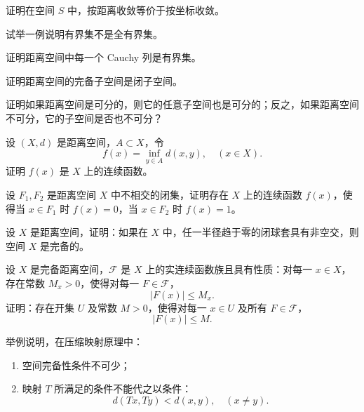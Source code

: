 \begin{exercise}
证明在空间 $S$ 中，按距离收敛等价于按坐标收敛。
\end{exercise}

\begin{exercise}
试举一例说明有界集不是全有界集。
\end{exercise}

\begin{exercise}
证明距离空间中每一个 Cauchy 列是有界集。
\end{exercise}

\begin{exercise}
证明距离空间的完备子空间是闭子空间。
\end{exercise}

\begin{exercise}
证明如果距离空间是可分的，则它的任意子空间也是可分的；反之，如果距离空间不可分，它的子空间是否也不可分？
\end{exercise}
\begin{exercise}
设 $(X,d)$ 是距离空间，$A \subset X$，令
\[
f(x) = \inf_{y \in A} d(x,y), \quad (x \in X).
\]
证明 $f(x)$ 是 $X$ 上的连续函数。
\end{exercise}

\begin{exercise}
设 $F_1, F_2$ 是距离空间 $X$ 中不相交的闭集，证明存在 $X$ 上的连续函数 $f(x)$，使得当 $x \in F_1$ 时 $f(x)=0$，当 $x \in F_2$ 时 $f(x)=1$。
\end{exercise}

\begin{exercise}
设 $X$ 是距离空间，证明：如果在 $X$ 中，任一半径趋于零的闭球套具有非空交，则空间 $X$ 是完备的。
\end{exercise}

\begin{exercise}
设 $X$ 是完备距离空间，$\mathcal{F}$ 是 $X$ 上的实连续函数族且具有性质：对每一 $x \in X$，存在常数 $M_x > 0$，使得对每一 $F \in \mathcal{F}$，
\[
|F(x)| \leq M_x.
\]
证明：存在开集 $U$ 及常数 $M>0$，使得对每一 $x \in U$ 及所有 $F \in \mathcal{F}$，
\[
|F(x)| \leq M.
\]
\end{exercise}
\begin{exercise}
举例说明，在压缩映射原理中：
\begin{enumerate}
  \item 空间完备性条件不可少；
  \item 映射 $T$ 所满足的条件不能代之以条件：
  \[
  d(Tx,Ty) < d(x,y), \quad (x \neq y).
  \]
\end{enumerate}
\end{exercise}

